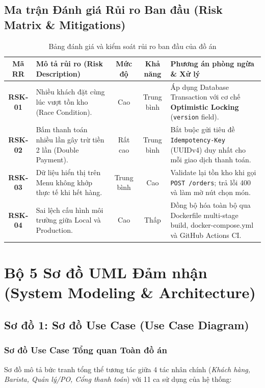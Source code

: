 \documentclass[a4paper]{article}
\begin{document}
\subsection{Ma trận Đánh giá Rủi ro Ban đầu (Risk Matrix \& Mitigations)}
\begin{table}[H]
\centering
\small
\begin{tabularx}{\textwidth}{|c|>{\raggedright\arraybackslash}p{4.2cm}|c|c|>{\raggedright\arraybackslash}X|}
\hline
\textbf{Mã RR} & \textbf{Mô tả rủi ro (Risk Description)} & \textbf{Mức độ} & \textbf{Khả năng} & \textbf{Phương án phòng ngừa \& Xử lý} \\ \hline
\textbf{RSK-01} & Nhiều khách đặt cùng lúc vượt tồn kho (Race Condition). & Cao & Trung bình & Áp dụng Database Transaction với cơ chế \textbf{Optimistic Locking} (\texttt{version} field). \\ \hline
\textbf{RSK-02} & Bấm thanh toán nhiều lần gây trừ tiền 2 lần (Double Payment). & Rất cao & Trung bình & Bắt buộc gửi tiêu đề \texttt{Idempotency-Key} (UUIDv4) duy nhất cho mỗi giao dịch thanh toán. \\ \hline
\textbf{RSK-03} & Dữ liệu hiển thị trên Menu không khớp thực tế khi hết hàng. & Trung bình & Cao & Validate lại tồn kho khi gọi \texttt{POST /orders}; trả lỗi 400 và làm mờ nút chọn món. \\ \hline
\textbf{RSK-04} & Sai lệch cấu hình môi trường giữa Local và Production. & Cao & Thấp & Đồng bộ hóa toàn bộ qua Dockerfile multi-stage build, docker-compose.yml và GitHub Actions CI. \\ \hline
\end{tabularx}
\caption{Bảng đánh giá và kiểm soát rủi ro ban đầu của đồ án}
\label{tab:risks}
\end{table}

\section{Bộ 5 Sơ đồ UML Đảm nhận (System Modeling \& Architecture)}

\subsection{Sơ đồ 1: Sơ đồ Use Case (Use Case Diagram)}

\subsubsection{Sơ đồ Use Case Tổng quan Toàn đồ án}
Sơ đồ mô tả bức tranh tổng thể tương tác giữa 4 tác nhân chính (\textit{Khách hàng, Barista, Quản lý/PO, Cổng thanh toán}) với 11 ca sử dụng của hệ thống:
\end{document}
